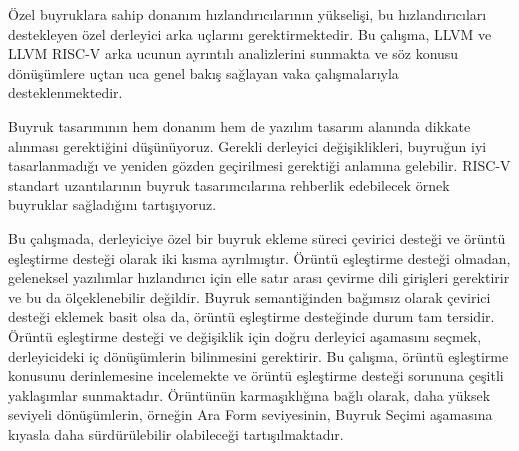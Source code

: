 Özel buyruklara sahip donanım hızlandırıcılarının yükselişi, bu hızlandırıcıları destekleyen özel derleyici arka uçlarını gerektirmektedir. Bu çalışma, LLVM ve LLVM RISC-V arka ucunun ayrıntılı analizlerini sunmakta ve söz konusu dönüşümlere uçtan uca genel bakış sağlayan vaka çalışmalarıyla desteklenmektedir. 

Buyruk tasarımının hem donanım hem de yazılım tasarım alanında dikkate alınması gerektiğini düşünüyoruz. Gerekli derleyici değişiklikleri, buyruğun iyi tasarlanmadığı ve yeniden gözden geçirilmesi gerektiği anlamına gelebilir. RISC-V standart uzantılarının buyruk tasarımcılarına rehberlik edebilecek örnek buyruklar sağladığını tartışıyoruz.

Bu çalışmada, derleyiciye özel bir buyruk ekleme süreci çevirici desteği ve örüntü eşleştirme desteği olarak iki kısma ayrılmıştır. Örüntü eşleştirme desteği olmadan, geleneksel yazılımlar hızlandırıcı için elle satır arası çevirme dili girişleri gerektirir ve bu da ölçeklenebilir değildir. Buyruk semantiğinden bağımsız olarak çevirici desteği eklemek basit olsa da, örüntü eşleştirme desteğinde durum tam tersidir. Örüntü eşleştirme desteği ve değişiklik için doğru derleyici aşamasını seçmek, derleyicideki iç dönüşümlerin bilinmesini gerektirir. Bu çalışma, örüntü eşleştirme konusunu derinlemesine incelemekte ve örüntü eşleştirme desteği sorununa çeşitli yaklaşımlar sunmaktadır. Örüntünün karmaşıklığına bağlı olarak, daha yüksek seviyeli dönüşümlerin, örneğin Ara Form seviyesinin, Buyruk Seçimi aşamasına kıyasla daha sürdürülebilir olabileceği tartışılmaktadır.






